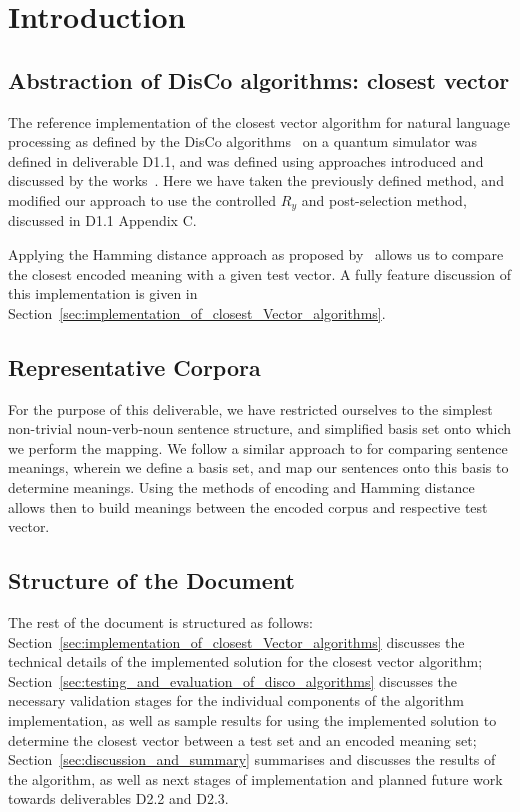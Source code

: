 \section{Introduction}
\label{sec:introduction}

\subsection{Abstraction of DisCo algorithms: closest vector}
\label{sec:abstraction_of_disco_algorithms}
The reference implementation of the closest vector algorithm for natural language processing as defined by the DisCo algorithms~\cite{Zeng_Coecke_2016, clark_coecke_sadrzadeh_2010, Coecke_Sadrzadeh_Clark_2010} on a quantum simulator was defined in deliverable D1.1, and was defined using approaches introduced and discussed by the works~\cite{Trugenberger_2001, Trugenberger_2002, Schuld_Sinayskiy_Petruccione_2014}. Here we have taken the previously defined method, and modified our approach to use the controlled $R_y$ and post-selection method, discussed in D1.1 Appendix C. 

Applying the Hamming distance approach as proposed by~\cite{Trugenberger_2001} allows us to compare the closest encoded meaning with a given test vector. A fully feature discussion of this implementation is given in Section~\ref{sec:implementation_of_closest_Vector_algorithms}.

\subsection{Representative Corpora}
\label{sec:representative_corpora}
For the purpose of this deliverable, we have restricted ourselves to the simplest non-trivial noun-verb-noun sentence structure, and simplified basis set onto which we perform the mapping. We follow a similar approach to \cite{clark_coecke_sadrzadeh_2010} for comparing sentence meanings, wherein we define a basis set, and map our sentences onto this basis to determine meanings. Using the methods of encoding and Hamming distance allows then to build meanings between the encoded corpus and respective test vector.

\subsection{Structure of the Document}
The rest of the document is structured as follows: Section~\ref{sec:implementation_of_closest_Vector_algorithms} discusses the technical details of the implemented solution for the closest vector algorithm; Section~\ref{sec:testing_and_evaluation_of_disco_algorithms} discusses the necessary validation stages for the individual components of the algorithm implementation, as well as sample results for using the implemented solution to determine the closest vector between a test set and an encoded meaning set; Section~\ref{sec:discussion_and_summary} summarises and discusses the results of the algorithm, as well as next stages of implementation and planned future work towards deliverables D2.2 and D2.3.